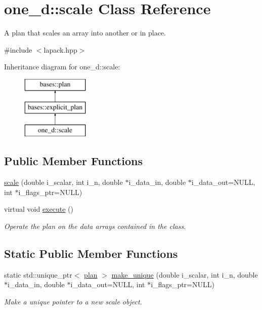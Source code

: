 \hypertarget{classone__d_1_1scale}{\section{one\-\_\-d\-:\-:scale Class Reference}
\label{classone__d_1_1scale}
}


A plan that scales an array into another or in place.  




{\ttfamily \#include $<$lapack.\-hpp$>$}

Inheritance diagram for one\-\_\-d\-:\-:scale\-:\begin{figure}[H]
\begin{center}
\leavevmode
\includegraphics[height=3.000000cm]{classone__d_1_1scale}
\end{center}
\end{figure}
\subsection*{Public Member Functions}
\begin{DoxyCompactItemize}
\item 
\hyperlink{classone__d_1_1scale_a8346e27a556d5e308fdd7566d5441d18}{scale} (double i\-\_\-scalar, int i\-\_\-n, double $\ast$i\-\_\-data\-\_\-in, double $\ast$i\-\_\-data\-\_\-out=N\-U\-L\-L, int $\ast$i\-\_\-flags\-\_\-ptr=N\-U\-L\-L)
\begin{DoxyCompactList}\small\item\em \end{DoxyCompactList}\item 
virtual void \hyperlink{classone__d_1_1scale_ab5e6afeca117593546251660efb232be}{execute} ()
\begin{DoxyCompactList}\small\item\em Operate the plan on the data arrays contained in the class. \end{DoxyCompactList}\end{DoxyCompactItemize}
\subsection*{Static Public Member Functions}
\begin{DoxyCompactItemize}
\item 
static std\-::unique\-\_\-ptr$<$ \hyperlink{classbases_1_1plan_a7b4ddc2f876b9e4dcf899feb20ae369f}{plan} $>$ \hyperlink{classone__d_1_1scale_ac179d436f35851150fe8c4229c161f3d}{make\-\_\-unique} (double i\-\_\-scalar, int i\-\_\-n, double $\ast$i\-\_\-data\-\_\-in, double $\ast$i\-\_\-data\-\_\-out=N\-U\-L\-L, int $\ast$i\-\_\-flags\-\_\-ptr=N\-U\-L\-L)
\begin{DoxyCompactList}\small\item\em Make a unique pointer to a new scale object. \end{DoxyCompactList}\end{DoxyCompactItemize}
